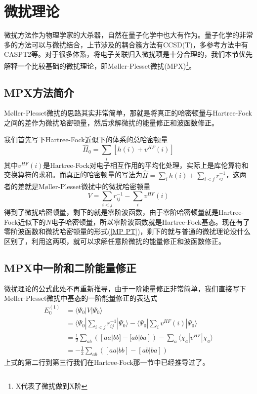 \documentclass[12pt,a4paper,openany,twoside]{book}
\numberwithin{equation}{section}
\begin{document}
      \section{微扰理论}
        微扰方法作为物理学家的大杀器，自然在量子化学中也大有作为。量子化学的非常多的方法可以与微扰结合，上节涉及的耦合簇方法有CCSD(T)，多参考方法中有CASPT2等。对于很多体系，将电子关联归入微扰项是十分合理的，我们本节优先解释一个比较基础的微扰理论，即M\o ller-Plesset微扰(MPX)\footnote{X代表了微扰做到X阶}。
        \subsection{MPX方法简介}
          M\o ller-Plesset微扰的思路其实非常简单，那就是将真正的哈密顿量与Hartree-Fock之间的差作为微扰哈密顿量，然后求解微扰的能量修正和波函数修正。

          我们首先写下Hartree-Fock近似下的体系的总哈密顿量
          \begin{equation}
            \hat{H}_0 = \sum_i \left[h(i) + v^{HF}(i)\right]
          \end{equation}
          其中$v^{HF}(i)$是Hartree-Fock对电子相互作用的平均化处理，实际上是库伦算符和交换算符的求和。而真正的哈密顿量的写法为$\hat{H} = \sum_i h(i) + \sum_{i <j} r_{ij}^{-1}$，这两者的差就是M\o ller-Plesset微扰中的微扰哈密顿量
          \begin{equation}
            V = \sum_{i <j} r_{ij}^{-1} -  \sum_i v^{HF}(i)
            \label{MP PT}
          \end{equation}
          得到了微扰哈密顿量，剩下的就是零阶波函数，由于零阶哈密顿量就是Hartree-Fock近似下的$N$电子哈密顿量，所以零阶波函数就是Hartree-Fock基态。现在有了零阶波函数和微扰哈密顿量的形式(\ref{MP PT})，剩下的就与普通的微扰理论没什么区别了，利用这两项，就可以求解任意阶微扰的能量修正和波函数修正。
        \subsection{MPX中一阶和二阶能量修正}
          微扰理论的公式此处不再重新推导，由于一阶能量修正非常简单，我们直接写下M\o ller-Plesset微扰中基态的一阶能量修正的表达式
          \begin{equation}
            \begin{aligned}
              E_0^{(1)} &= \langle \Psi_0 | V | \Psi_0 \rangle\\
              &=\langle \Psi_0 | \sum_{i <j} r_{ij}^{-1} | \Psi_0 \rangle - \langle \Psi_0 |  \sum_i v^{HF}(i) | \Psi_0 \rangle\\
              &=\frac{1}{2}\sum_{ab}([aa|bb] - [ab|ba]) - \sum_a \langle \chi_a | v^{HF} |  \chi_a \rangle\\
              &=-\frac{1}{2}\sum_{ab}([aa|bb] - [ab|ba]) 
            \end{aligned}
            \label{MP1 energy correction}
          \end{equation}
          上式的第二行到第三行我们在Hartree-Fock那一节中已经推导过了。
\end{document}
